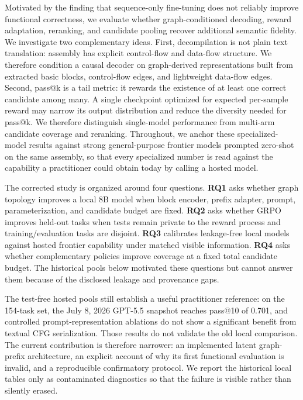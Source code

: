 \documentclass[11pt]{article}
\begin{document}
Motivated by the finding that sequence-only fine-tuning does not reliably improve functional correctness, we evaluate whether graph-conditioned decoding, reward adaptation, reranking, and candidate pooling recover additional semantic fidelity. We investigate two complementary ideas. First, decompilation is not plain text translation: assembly has explicit control-flow and data-flow structure. We therefore condition a causal decoder on graph-derived representations built from extracted basic blocks, control-flow edges, and lightweight data-flow edges. Second, pass@k is a tail metric: it rewards the existence of at least one correct candidate among many. A single checkpoint optimized for expected per-sample reward may narrow its output distribution and reduce the diversity needed for pass@k. We therefore distinguish single-model performance from multi-arm candidate coverage and reranking. Throughout, we anchor these specialized-model results against strong general-purpose frontier models prompted zero-shot on the same assembly, so that every specialized number is read against the capability a practitioner could obtain today by calling a hosted model.

The corrected study is organized around four questions. \textbf{RQ1} asks whether graph topology improves a local 8B model when block encoder, prefix adapter, prompt, parameterization, and candidate budget are fixed. \textbf{RQ2} asks whether GRPO improves held-out tasks when tests remain private to the reward process and training/evaluation tasks are disjoint. \textbf{RQ3} calibrates leakage-free local models against hosted frontier capability under matched visible information. \textbf{RQ4} asks whether complementary policies improve coverage at a fixed total candidate budget. The historical pools below motivated these questions but cannot answer them because of the disclosed leakage and provenance gaps.

The test-free hosted pools still establish a useful practitioner reference: on the 154-task set, the July 8, 2026 GPT-5.5 snapshot reaches pass@10 of 0.701, and controlled prompt-representation ablations do not show a significant benefit from textual CFG serialization. Those results do not validate the old local comparison. The current contribution is therefore narrower: an implemented latent graph-prefix architecture, an explicit account of why its first functional evaluation is invalid, and a reproducible confirmatory protocol. We report the historical local tables only as contaminated diagnostics so that the failure is visible rather than silently erased.
\end{document}
